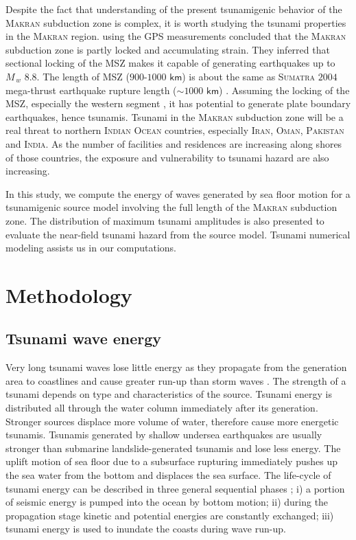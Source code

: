 \documentclass[12pt]{llncs}
\begin{document}
Despite the fact that understanding of the present tsunamigenic behavior of the \textsc{Makran} subduction zone is complex, it is worth studying the tsunami properties in the \textsc{Makran} region. \cite{doi:10.1093/gji/ggw001} using the GPS measurements concluded that the \textsc{Makran} subduction zone is partly locked and accumulating strain. They inferred that sectional locking of the MSZ makes it capable of generating earthquakes up to $M_{\,w}$ $8.8$. The length of MSZ ($900$-$1000$ $\mathsf{km}$) is about the same as \textsc{Sumatra} $2004$ mega-thrust earthquake rupture length ($\sim 1000$ $\mathsf{km}$) \citep{Ammon1133}. Assuming the locking of the MSZ, especially the western segment \citep{doi:10.1144/0016-76492008-119, Rajendran2013}, it has potential to generate plate boundary earthquakes, hence tsunamis. Tsunami in the \textsc{Makran} subduction zone will be a real threat to northern \textsc{Indian Ocean} countries, especially \textsc{Iran}, \textsc{Oman}, \textsc{Pakistan} and \textsc{India}. As the number of facilities and residences are increasing along shores of those countries, the exposure and vulnerability to tsunami hazard are also increasing.
 
In this study, we compute the energy of waves generated by sea floor motion for a tsunamigenic source model involving the full length of the \textsc{Makran} subduction zone. The distribution of maximum tsunami amplitudes is also presented to evaluate the near-field tsunami hazard from the source model. Tsunami numerical modeling assists us in our computations.

%

\section{Methodology}

\subsection{Tsunami wave energy}

Very long tsunami waves lose little energy as they propagate from the generation area to coastlines and cause greater run-up than storm waves \citep{bryant2008tsunami}. The strength of a tsunami depends on type and characteristics of the source. Tsunami energy is distributed all through the water column immediately after its generation. Stronger sources displace more volume of water, therefore cause more energetic tsunamis. Tsunamis generated by shallow undersea earthquakes are usually stronger than submarine landslide-generated tsunamis and lose less energy. The uplift motion of sea floor due to a subsurface rupturing immediately pushes up the sea water from the bottom and displaces the sea surface. The life-cycle of tsunami energy can be described in three general sequential phases \citep{Dutykh2009b}; i) a portion of seismic energy is pumped into the ocean by bottom motion; ii) during the propagation stage kinetic and potential energies are constantly exchanged; iii) tsunami energy is used to inundate the coasts during wave run-up. 
\end{document}

